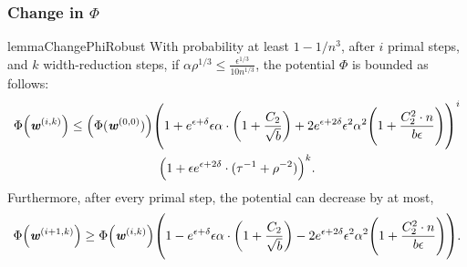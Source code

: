 \documentclass[11pt]{article}
\let\originalleft\left
\let\originalright\right
\renewcommand{\left}{\mathopen{}\mathclose\bgroup\originalleft}
\renewcommand{\right}{\aftergroup\egroup\originalright}
\newcommand\ww{\boldsymbol{\mathit{w}}}
\begin{document}
\subsubsection*{Change in $\Phi$}
\begin{restatable}{lemma}{ChangePhiRobust}
  \label{lem:ChangePhiRobust}
  With probability at least $1-1/n^3$, after $i$ primal steps, and $k$ width-reduction steps, if $\alpha \rho^{1/3}\leq \frac{\epsilon^{1/3}}{10 n^{1/3}}$,
  the potential $\Phi$ is bounded as follows:
  \begin{multline*}
\Phi\left(\ww^{(i,k)}\right) \leq \left(\Phi(\ww^{(0,0)})\right)\left( 1 + e^{\epsilon+\delta}\epsilon \alpha  \cdot \left(1 + \frac{C_2}{\sqrt{b}}\right) + 2e^{\epsilon+2\delta} \epsilon^2 \alpha^2 \left(1 + \frac{C_2^2 \cdot n}{b \epsilon}\right) \right)^i\\ \left( 1 + \epsilon e^{\epsilon+2\delta} \cdot (\tau^{-1} + \rho^{-2}) \right)^k.
 \end{multline*}
 Furthermore, after every primal step, the potential can decrease by at most,
 \[
 \Phi\left(\ww^{(i+1,k)}\right) \geq  \Phi\left(\ww^{(i,k)}\right)\left( 1 - e^{\epsilon+\delta}\epsilon \alpha  \cdot \left(1 + \frac{C_2}{\sqrt{b}}\right) - 2e^{\epsilon+2\delta} \epsilon^2 \alpha^2 \left(1 + \frac{C_2^2 \cdot n}{b \epsilon}\right) \right).  
 \]
\end{restatable}
\end{document}
